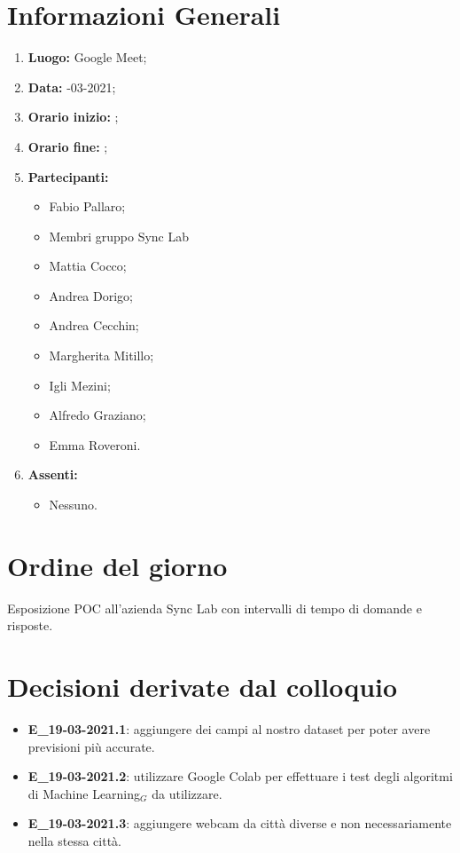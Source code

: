 \newpage
\section{Informazioni Generali}
\begin{enumerate}
	\item \textbf{Luogo:} \normalfont Google Meet;
	\item \textbf{Data:} -03-2021;
	\item \textbf{Orario inizio:} ;
	\item \textbf{Orario fine:} ;
	\item \textbf{Partecipanti:}
	\begin{itemize}
		\item Fabio Pallaro;
		\item Membri gruppo Sync Lab
		\item Mattia Cocco;
		\item Andrea Dorigo;
		\item Andrea Cecchin;
		\item Margherita Mitillo;
		\item Igli Mezini;
		\item Alfredo Graziano;
		\item Emma Roveroni.
	\end{itemize}
	\item \textbf{Assenti:}
	\begin{itemize}
		\item Nessuno.
	\end{itemize}
\end{enumerate}
\section{Ordine del giorno}
Esposizione POC all'azienda Sync Lab con intervalli di tempo di domande e risposte.

\section{Decisioni derivate dal colloquio}
\begin{itemize}
	\item \textbf{E\_19-03-2021.1}: aggiungere dei campi al nostro dataset per poter avere previsioni più accurate.
\end{itemize}
\begin{itemize}
	\item \textbf{E\_19-03-2021.2}: utilizzare Google Colab per effettuare i test degli algoritmi di Machine Learning$_G$ da utilizzare.
\end{itemize}
\begin{itemize}
	\item \textbf{E\_19-03-2021.3}: aggiungere webcam da città diverse e non necessariamente nella stessa città.
\end{itemize}